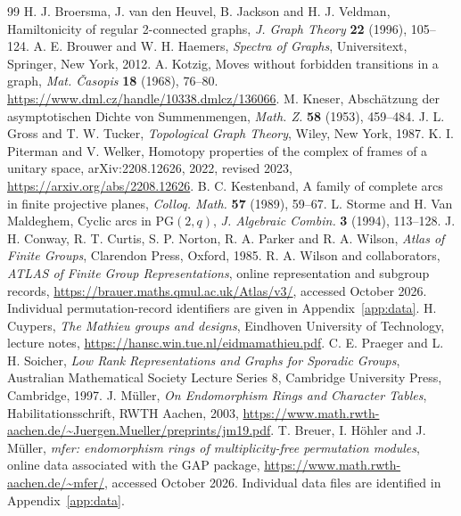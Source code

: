 \documentclass[11pt]{article}
\theoremstyle{definition}
\newcommand{\PG}{\mathrm{PG}}
\begin{document}
\begin{thebibliography}{99}
 H. J. Broersma, J. van den Heuvel, B. Jackson and H. J. Veldman, Hamiltonicity of regular 2-connected graphs, \emph{J. Graph Theory} \textbf{22} (1996), 105--124.
 A. E. Brouwer and W. H. Haemers, \emph{Spectra of Graphs}, Universitext, Springer, New York, 2012.
 A. Kotzig, Moves without forbidden transitions in a graph, \emph{Mat. \v{C}asopis} \textbf{18} (1968), 76--80. \url{https://www.dml.cz/handle/10338.dmlcz/136066}.
 M. Kneser, Absch\"atzung der asymptotischen Dichte von Summenmengen, \emph{Math. Z.} \textbf{58} (1953), 459--484.
 J. L. Gross and T. W. Tucker, \emph{Topological Graph Theory}, Wiley, New York, 1987.
 K. I. Piterman and V. Welker, Homotopy properties of the complex of frames of a unitary space, arXiv:2208.12626, 2022, revised 2023, \url{https://arxiv.org/abs/2208.12626}.
 B. C. Kestenband, A family of complete arcs in finite projective planes, \emph{Colloq. Math.} \textbf{57} (1989), 59--67.
 L. Storme and H. Van Maldeghem, Cyclic arcs in $\PG(2,q)$, \emph{J. Algebraic Combin.} \textbf{3} (1994), 113--128.
 J. H. Conway, R. T. Curtis, S. P. Norton, R. A. Parker and R. A. Wilson, \emph{Atlas of Finite Groups}, Clarendon Press, Oxford, 1985.
 R. A. Wilson and collaborators, \emph{ATLAS of Finite Group Representations}, online representation and subgroup records, \url{https://brauer.maths.qmul.ac.uk/Atlas/v3/}, accessed October 2026. Individual permutation-record identifiers are given in Appendix~\ref{app:data}.
 H. Cuypers, \emph{The Mathieu groups and designs}, Eindhoven University of Technology, lecture notes, \url{https://hansc.win.tue.nl/eidmamathieu.pdf}.
 C. E. Praeger and L. H. Soicher, \emph{Low Rank Representations and Graphs for Sporadic Groups}, Australian Mathematical Society Lecture Series 8, Cambridge University Press, Cambridge, 1997.
 J. M\"uller, \emph{On Endomorphism Rings and Character Tables}, Habilitationsschrift, RWTH Aachen, 2003, \url{https://www.math.rwth-aachen.de/~Juergen.Mueller/preprints/jm19.pdf}.
 T. Breuer, I. H\"ohler and J. M\"uller, \emph{mfer: endomorphism rings of multiplicity-free permutation modules}, online data associated with the GAP package, \url{https://www.math.rwth-aachen.de/~mfer/}, accessed October 2026. Individual data files are identified in Appendix~\ref{app:data}.
\end{thebibliography}
\end{document}
